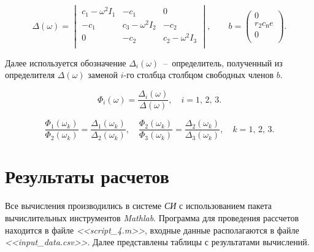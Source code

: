 \documentclass[12pt, a4paper]{article}
\begin{document}
    \begin{equation}
        \Delta(\omega) = 
        \begin{vmatrix}
            c_{1} - \omega^{2} I_{1} & -c_{1} & 0 \\
            -c_{1} & c_{3} - \omega^{2} I_{2} & -c_{2} \\
            0 & -c_{2} & c_{2} - \omega^{2} I_{3} \\
        \end{vmatrix}, \qquad
        b = 
        \begin{pmatrix}
            0 \\
            r_{2} c_{\text{п}} e \\
            0 \\
        \end{pmatrix}.
        \label{eq4}
    \end{equation}
    
    Далее используется обозначение $\Delta_{i}(\omega)$~--~определитель, полученный из определителя $\Delta(\omega)$ заменой $i$-го столбца столбцом свободных членов $b$.
    
    \begin{equation}
        \Phi_{i}(\omega) = \frac{\Delta_{i}(\omega)}{\Delta(\omega)}, \quad
        i = 1, \, 2, \, 3.
        \label{eq5}
    \end{equation}
    
    \begin{equation}
        \frac{\Phi_{1}(\omega_{k})}{\Phi_{2}(\omega_{k})} = \frac{\Delta_{1}(\omega_{k})}{\Delta_{2}(\omega_{k})}, \quad
        \frac{\Phi_{2}(\omega_{k})}{\Phi_{3}(\omega_{k})} = \frac{\Delta_{2}(\omega_{k})}{\Delta_{3}(\omega_{k})}, \quad
        k = 1, \, 2, \, 3.
        \label{eq6}
    \end{equation}
    
    \newpage
    
    \section{Результаты расчетов}
    
    Все вычисления производились в системе \textit{СИ} с использованием пакета вычислительных инструментов \textit{Mathlab}. Программа для проведения рассчетов находится в файле \textit{<<script\_4.m>>}, входные данные располагаются в файле \textit{<<input\_data.csv>>}. Далее представлены таблицы с результатами вычислений.
    
\end{document}
